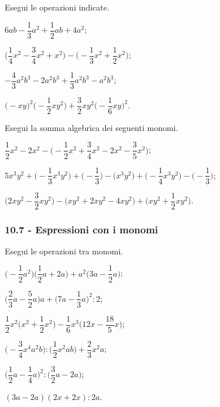 \begin{esercizio}[\Ast]
 \label{ese:10.30} %
Esegui le operazioni indicate.
\begin{multicols}{2}
\begin{enumeratea}
\spazielenx
 \item $6ab-\dfrac{1}{3}a^{2}+\dfrac{1}{2}ab+4a^{2}$;
 \item $\bigg(\dfrac{1}{4}x^{2}-\dfrac{3}{4}x^{2}+x^{2}\bigg)-\bigg(-{\dfrac{1}{3}}x^{2}+\dfrac{1}{2}x^{2}\bigg)$;
 \item $-{\dfrac{4}{3}}a^{2}b^{3}-2a^{2}b^{3}+\dfrac{1}{3}a^{2}b^{3}-a^{2}b^{3}$;
 \item $\big(-xy\big)^{2}\bigg(-{\dfrac{1}{2}}xy^{2}\bigg)+\dfrac{3}{2}xy^{2}\bigg(-{\dfrac{1}{6}}xy\bigg)^{2}$.
\end{enumeratea}
\end{multicols}
\end{esercizio}

\begin{esercizio}[\Ast]
 \label{ese:10.31} %
Esegui la somma algebrica dei seguenti monomi.

\begin{enumeratea}
\spazielenx
 \item $\dfrac{1}{2}x^{2}-2x^{2}-\bigg(-{\dfrac{1}{2}}x^{2}+\dfrac{3}{4}x^{2}-2x^{2}-\dfrac{3}{5}x^{2}\bigg)$;
 \item $5x^{3}y^{2}+\bigg(-{\dfrac{1}{3}}x^{3}y^{2}\bigg)+\bigg(-{\dfrac{1}{3}}\bigg)-\big(x^{3}y^{2}\big)+\bigg(-{\dfrac{1}{4}}x^{3}y^{2}\bigg)-\bigg(-{\dfrac{1}{3}}\bigg)$;
 \item $\bigg(2xy^{2}-\dfrac{3}{2}xy^{2}\bigg)-\big(xy^{2}+2xy^{2}-4xy^{2}\big)+\bigg(xy^{2}+\dfrac{1}{2}xy^{2}\bigg)$.
\end{enumeratea}
\end{esercizio}

\subsubsection*{10.7 - Espressioni con i monomi}
\begin{esercizio}[\Ast]
 \label{ese:10.32} %
Esegui le operazioni tra monomi.
\begin{multicols}{2}
\begin{enumeratea}
 \item $\bigg(-\dfrac{1}{2}a^{2}\bigg)\bigg(\dfrac{1}{2}a+2a\bigg)+a^{2}\bigg(3a-\dfrac{1}{2}a\bigg)$;
 \item $\bigg(\dfrac{2}{3}a-\dfrac{5}{2}a\bigg)a+\bigg(7a-\dfrac{1}{3}a\bigg)^{2}:2$;
 \item $\dfrac{1}{2}x^{2}\bigg(x^{2}+\dfrac{1}{2}x^{2}\bigg)-\dfrac{1}{6}x^{3}\bigg(12x-\dfrac{18}{5}x\bigg)$;
 \item $\bigg(-{\dfrac{3}{4}}x^{4}a^{2}b\bigg):\bigg(\dfrac{1}{2}x^{2}ab\bigg)+\dfrac{2}{3}x^{2}a$;
 \item $\bigg(\dfrac{1}{2}a-\dfrac{1}{4}a\bigg)^{2}:\bigg(\dfrac{3}{2}a-2a\bigg)$;
 \item $(3a-2a)(2x+2x):2a$.
\end{enumeratea}
\end{multicols}
\end{esercizio}

